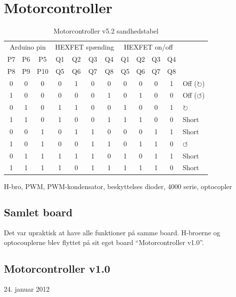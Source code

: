 \documentclass[a4paper,oneside,article,danish,table]{memoir}
\newcommand{\boarddate}[1]{\textcolor{blue!80!black}{#1}}
\begin{document}
\section{Motorcontroller}

\begin{table}[htbp]
  \caption{Motorcontroller v5.2 sandhedstabel}
  \centering
  \begin{tabular}{ccc|cccc|ccccl}
    \toprule
    \multicolumn{3}{c}{Arduino pin}&\multicolumn{4}{c}{HEXFET spænding}&\multicolumn{4}{c}{HEXFET on/off}\\
    P7&P6&P5 &Q1&Q2&Q3&Q4 &Q1&Q2&Q3&Q4\\
    P8&P9&P10 &Q5&Q6&Q7&Q8 &Q5&Q6&Q7&Q8\\
    \midrule
    0&0&0 &0&1&0&0 &0&0&0&1 & Off ($\circlearrowright$)\\
    1&0&0 &0&0&0&1 &0&1&0&0 & Off ($\circlearrowleft$)\\
    0&1&0 &1&1&0&0 &1&0&0&1 & $\circlearrowright$\\
    1&1&0 &1&0&0&1 &1&1&0&0 & Short\\
    0&0&1 &0&1&1&0 &0&0&1&1 & Short\\
    1&0&1 &0&0&1&1 &0&1&1&0 & $\circlearrowleft$\\
    0&1&1 &1&1&1&0 &1&0&1&1 & Short\\
    1&1&1 &1&0&1&1 &1&1&1&0 & Short\\
    \bottomrule
  \end{tabular}
  \label{tab:sandhed}
\end{table}

H-bro, PWM, PWM-kondensator, beskyttelses dioder, 4000 serie, optocopler

\subsection{Samlet board}
Det var upraktisk at have alle funktioner på samme board. H-broerne og optocouplerne blev flyttet på sit eget board “Motorcontroller v1.0”.

\subsection{Motorcontroller v1.0} 
\boarddate{24. januar 2012}
\end{document}
